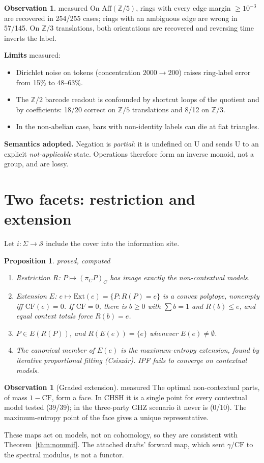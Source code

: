 \documentclass[11pt]{article}
\newtheorem{proposition}[theorem]{Proposition}
\theoremstyle{definition}
\newtheorem{observation}[theorem]{Observation}
\theoremstyle{remark}
\newcommand{\Z}{\mathbb{Z}}
\newcommand{\CF}{\mathrm{CF}}
\newcommand{\Aff}{\mathrm{Aff}}
\newcommand{\st}[1]{\textsf{\small\color{gray}#1}}
\begin{document}
\begin{observation}\label{res:auto20}\st{measured}
On $\Aff(\Z/5)$, rings with every edge margin $\ge10^{-3}$ are recovered in 254/255 cases; rings with an ambiguous edge are wrong in 57/145. On $\Z/3$ translations, both orientations are recovered and reversing time inverts the label.
\end{observation}
\noindent\textbf{Limits} \st{measured}:
\begin{itemize}
  \item Dirichlet noise on tokens (concentration $2000\to200$) raises ring-label error from 15\% to 48--63\%.
  \item The $\Z/2$ barcode readout is confounded by shortcut loops of the quotient and by coefficients: 18/20 correct on $\Z/5$ translations and 8/12 on $\Z/3$.
  \item In the non-abelian case, bars with non-identity labels can die at flat triangles.
\end{itemize}
\noindent\textbf{Semantics adopted.} Negation is \emph{partial}: it is undefined on U and sends U to an explicit \emph{not-applicable} state. Operations therefore form an inverse monoid, not a group, and are lossy.

\section{Two facets: restriction and extension}\label{sec:functors}
Let $i:\Sigma\to\mathcal S$ include the cover into the information site.
\begin{proposition}\label{res:auto21}\st{proved, computed}
\begin{enumerate}
  \item \emph{Restriction} $R$: $P\mapsto(\pi_C P)_C$ has image exactly the non-contextual models.
  \item \emph{Extension} $E$: $e\mapsto\mathrm{Ext}(e)=\{P:R(P)=e\}$ is a convex polytope, nonempty iff $\CF(e)=0$. If $\CF=0$, there is $b\ge0$ with $\sum b=1$ and $R(b)\le e$, and equal context totals force $R(b)=e$.
  \item $P\in E(R(P))$, and $R(E(e))=\{e\}$ whenever $E(e)\ne\emptyset$.
  \item The canonical member of $E(e)$ is the maximum-entropy extension, found by iterative proportional fitting (Csisz\'ar). IPF fails to converge on contextual models.
\end{enumerate}
\end{proposition}
\begin{observation}[Graded extension]\label{res:auto22}\st{measured}
The optimal non-contextual parts, of mass $1-\CF$, form a face. In CHSH it is a single point for every contextual model tested (39/39); in the three-party GHZ scenario it never is (0/10). The maximum-entropy point of the face gives a unique representative.
\end{observation}
\noindent These maps act on models, not on cohomology, so they are consistent with Theorem~\ref{thm:nonunif}. The attached drafts' forward map, which sent $\gamma/\CF$ to the spectral modulus, is not a functor.
\end{document}
